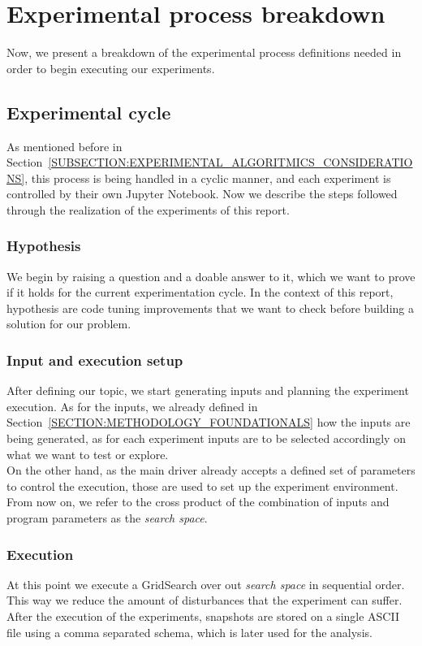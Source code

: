 \section{Experimental process breakdown}
Now, we present a breakdown of the experimental process definitions needed in order to begin executing our experiments.\\

\subsection{Experimental cycle}
As mentioned before in Section~\ref{SUBSECTION:EXPERIMENTAL_ALGORITMICS_CONSIDERATIONS}, this process is being handled in a cyclic manner, and each experiment is controlled by their own Jupyter Notebook. Now we describe the steps followed through the realization of the experiments of this report.\\

\subsubsection{Hypothesis}
We begin by raising a question and a doable answer to it, which we want to prove if it holds for the current experimentation cycle. In the context of this report, hypothesis are code tuning improvements that we want to check before building a solution for our problem.\\

\subsubsection{Input and execution setup}
After defining our topic, we start generating inputs and planning the experiment execution. As for the inputs, we already defined in Section~\ref{SECTION:METHODOLOGY_FOUNDATIONALS} how the inputs are being generated, as for each experiment inputs are to be selected accordingly on what we want to test or explore. \\

On the other hand, as the main driver already accepts a defined set of parameters to control the execution, those are used to set up the experiment environment. From now on, we refer to the cross product of the combination of inputs and program parameters as the \textit{search space}.\\

\subsubsection{Execution}
At this point we execute a GridSearch over out \textit{search space} in sequential order. This way we reduce the amount of disturbances that the experiment can suffer. After the execution of the experiments, snapshots are stored on a single ASCII file using a comma separated schema, which is later used for the analysis.\\

